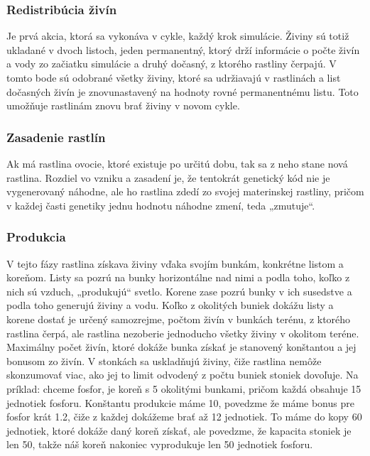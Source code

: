 \documentclass[12pt]{article}
\begin{document}
\subsubsection{Redistribúcia živín}

Je prvá akcia, ktorá sa vykonáva v cykle, každý krok simulácie. Živiny sú totiž
ukladané v dvoch listoch, jeden permanentný, ktorý drží informácie o počte
živín a vody zo začiatku simulácie a druhý dočasný, z ktorého rastliny čerpajú.
V tomto bode sú odobrané všetky živiny, ktoré sa udržiavajú v rastlinách a list
dočasných živín je znovunastavený na hodnoty rovné permanentnému listu.
Toto umožňuje rastlinám znovu brať živiny v novom cykle.

\subsubsection{Zasadenie rastlín}

Ak má rastlina ovocie, ktoré existuje po určitú dobu, tak sa z neho stane nová
rastlina. Rozdiel vo vzniku a zasadení je, že tentokrát genetický kód nie je
vygenerovaný náhodne, ale ho rastlina zdedí zo svojej materinskej rastliny,
pričom v každej časti genetiky jednu hodnotu náhodne zmení, teda „zmutuje“.

\subsubsection{Produkcia}

V tejto fázy rastlina získava živiny vďaka svojím bunkám, konkrétne listom
a koreňom. Listy sa pozrú na bunky horizontálne nad nimi a podla toho, koľko
z nich sú vzduch, „produkujú“ svetlo. Korene zase pozrú bunky v ich susedstve
a podla toho generujú živiny a vodu. Koľko z okolitých buniek dokážu listy
a korene dostať je určený samozrejme, počtom živín v bunkách terénu, z ktorého
rastlina čerpá, ale rastlina nezoberie jednoducho všetky živiny v okolitom
teréne. Maximálny počet živín, ktoré dokáže bunka získať je stanovený
konštantou a jej bonusom zo živín. V stonkách sa uskladňujú živiny, čiže
rastlina nemôže skonzumovať viac, ako jej to limit odvodený z počtu buniek
stoniek dovoľuje. Na príklad: chceme fosfor, je koreň s 5 okolitými bunkami,
pričom každá obsahuje 15 jednotiek fosforu. Konštantu produkcie máme 10,
povedzme že máme bonus pre fosfor krát 1.2, čiže z každej dokážeme brať až 12
jednotiek. To máme do kopy 60 jednotiek, ktoré dokáže daný koreň získať,
ale povedzme, že kapacita stoniek je len 50, takže náš koreň nakoniec
vyprodukuje len 50 jednotiek fosforu.
\end{document}
